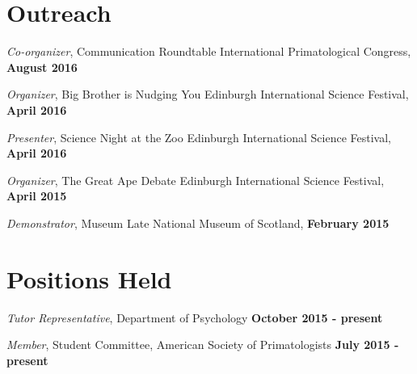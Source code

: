 \documentclass[margin,line]{res}
\begin{document}
\begin{resume}
\section{\sc Outreach} 


\vspace{-.2cm}
{\em Co-organizer}, Communication Roundtable \hfill International Primatological Congress,  {\bf August 2016}\\
\vspace{-.5cm}

\vspace{-.2cm}
{\em Organizer}, Big Brother is Nudging You \hfill  Edinburgh International Science Festival,  {\bf April 2016}\\
\vspace{-.5cm}

\vspace{-.2cm}
{\em Presenter}, Science Night at the Zoo \hfill  Edinburgh International Science Festival,  {\bf April 2016}\\
\vspace{-.5cm}

\vspace{-.2cm}
{\em Organizer}, The Great Ape Debate \hfill  Edinburgh International Science Festival,  {\bf April 2015}\\
\vspace{-.5cm}

\vspace{-.2cm}
{\em Demonstrator}, Museum Late  \hfill  National Museum of Scotland,  {\bf February 2015}\\
\vspace{-.5cm}


\vspace{1cm}

\section{\sc Positions Held} 

\vspace{-.2cm}
{\em Tutor Representative}, Department of Psychology \hfill  {\bf October 2015 - present}\\
\vspace{-.5cm}

\vspace{-.2cm}
{\em Member}, Student Committee, American Society of Primatologists \hfill   {\bf July 2015 - present}\\
\vspace{-.5cm}


\end{resume}
\end{document}
